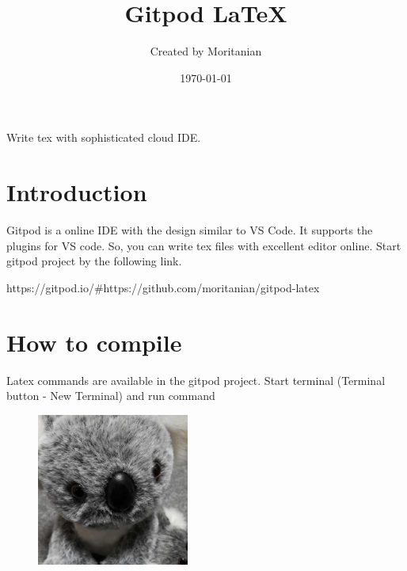 \documentclass[12pt]{article}
\title{Gitpod \LaTeX}
\author{Created by Moritanian}
\date{\today}
\begin{document}
  \maketitle
  Write tex with sophisticated cloud IDE.

 \section*{Introduction}
Gitpod is a online IDE with the design similar to VS Code.
It supports the plugins for VS code.
So, you can write tex files with excellent editor online.
Start gitpod project by the following link.

https://gitpod.io/#https://github.com/moritanian/gitpod-latex

\section*{How to compile}
Latex commands are available in the gitpod project.
Start terminal (Terminal button - New Terminal) and run command

\begin{figure}
  \begin{center}
  \includegraphics[height=5cm, keepaspectratio]{mettya_kawaii}
  \end{center}
\end{figure}

  
\end{document}
